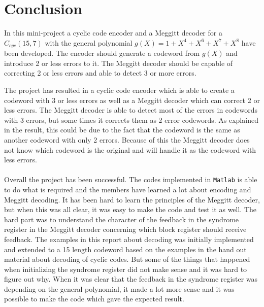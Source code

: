 \documentclass[Main]{subfiles}
\begin{document}
\section{Conclusion}
In this mini-project a cyclic code encoder and a Meggitt decoder for a $C_{cyc}(15,7)$ with the general polynomial $g(X)=1+X^4+X^6+X^7+X^8$ have been developed.
The encoder should generate a codeword from $g(X)$ and introduce 2 or less errors to it.
The Meggitt decoder should be capable of correcting 2 or less errors and able to detect 3 or more errors.

The project has resulted in a cyclic code encoder which is able to create a codeword with 3 or less errors as well as a Meggitt decoder which can correct 2 or less errors.
The Meggitt decoder is able to detect most of the errors in codewords with 3 errors, but some times it corrects them as 2 error codewords.
As explained in the result, this could be due to the fact that the codeword is the same as another codeword with only 2 errors. Because of this the Meggitt decoder does not know which codeword is the original and will handle it as the codeword with less errors.  
\\
\\
Overall the project has been successful.
The codes implemented in \texttt{Matlab} is able to do what is required and the members have learned a lot about encoding and Meggitt decoding.
It has been hard to learn the principles of the Meggitt decoder, but when this was all clear, it was easy to make the code and test it as well.
The hard part was to understand the character of the feedback in the syndrome register in the Meggitt decoder concerning which block register should receive feedback.
The examples in this report about decoding was initially implemented and extended to a 15 length codeword based on the examples in the hand out material about decoding of cyclic codes.
But some of the things that happened when initializing the syndrome register did not make sense and it was hard to figure out why.
When it was clear that the feedback in the syndrome register was depending on the general polynomial, it made a lot more sense and it was possible to make the code which gave the expected result.
\end{document}

